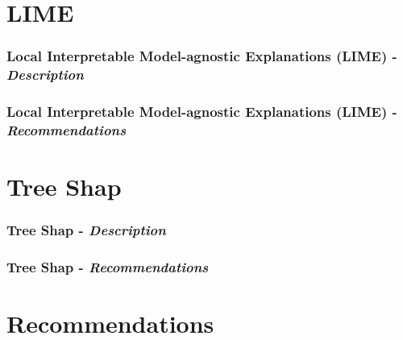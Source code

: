 \documentclass[11pt, 
               aspectratio=169
               ]{beamer}
\begin{document}
	\section{LIME}

		\begin{frame}
		
			\frametitle{Local Interpretable Model-agnostic Explanations (LIME) - \textit{Description}}
			
		\end{frame}
	
		\begin{frame}
		
			\frametitle{Local Interpretable Model-agnostic Explanations (LIME) - \textit{Recommendations}}
			
		\end{frame}


	\section{Tree Shap}

		\begin{frame}
		
			\frametitle{Tree Shap - \textit{Description}}
			
		\end{frame}
	
		\begin{frame}
		
			\frametitle{Tree Shap - \textit{Recommendations}}
			
		\end{frame}


	\section{Recommendations}
\end{document}
